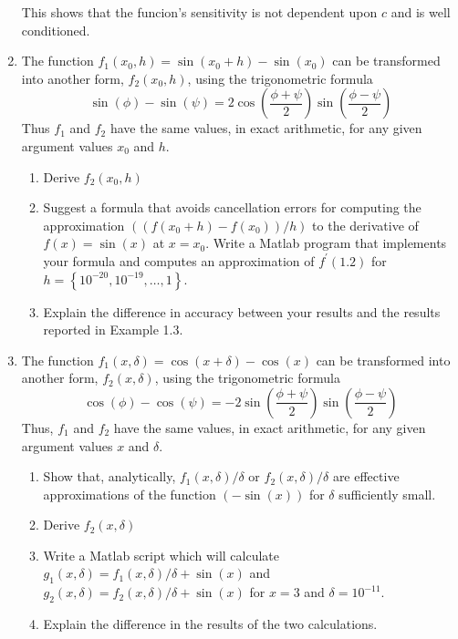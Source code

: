 \documentclass[12pt]{article}
\begin{document}
\begin{enumerate}
This shows that the funcion's sensitivity is not dependent upon $c$ and is well conditioned.


\item The function $f_{1}\left(x_{0},h\right) = \sin\left(x_{0}+h\right) - \sin\left(x_{0}\right)$
can be transformed into another form, $f_{2}\left(x_{0},h\right)$, using the
trigonometric formula
\[
\sin(\phi) - \sin(\psi) = 2\cos\left(\frac{\phi + \psi}{2}\right)\sin\left(\frac{\phi - \psi}{2}\right)
\]
Thus $f_{1}$ and $f_{2}$ have the same values, in exact arithmetic, for any given
argument values $x_{0}$ and $h$.
\begin{enumerate}
\item Derive $f_{2}\left(x_{0},h\right)$
\item Suggest a formula that avoids cancellation errors for computing the approximation
$\left(\left( f\left( x_{0}+h\right) - f\left(x_{0}\right)\right) /h\right)$
to the derivative of $f(x)=\sin(x)$ at $x=x_{0}$. Write a {\sc Matlab} program
that implements your formula and computes an approximation of $f^{\prime}(1.2)$
for $h = \left\{ 10^{-20},10^{-19},\ldots,1\right\}$.
\item Explain the difference in accuracy between your results and the results
reported in Example 1.3.
\end{enumerate}

\item The function $f_{1}(x,\delta) = \cos(x+\delta)-\cos(x)$ can be transformed
into another form, $f_{2}(x,\delta)$, using the trigonometric formula
\[
\cos(\phi) - \cos(\psi) = -2\sin\left(\frac{\phi + \psi}{2}\right)\sin\left(\frac{\phi - \psi}{2}\right)
\]
Thus, $f_{1}$ and $f_{2}$ have the same values, in exact arithmetic, for any given
argument values $x$ and $\delta$.
\begin{enumerate}
\item Show that, analytically, $f_{1}(x,\delta)/\delta$ or $f_{2}(x,\delta)/\delta$
are effective approximations of the function $(-\sin(x))$ for $\delta$ sufficiently small.
\item Derive $f_{2}(x,\delta)$
\item Write a {\sc Matlab} script which will calculate $g_{1}(x,\delta) = f_{1}(x,\delta)/\delta + \sin(x)$
and $g_{2}(x,\delta) = f_{2}(x,\delta)/\delta + \sin(x)$ for $x = 3$ and $\delta = 10^{-11}$.
\item Explain the difference in the results of the two calculations.
\end{enumerate}


\end{enumerate}
\end{document}
